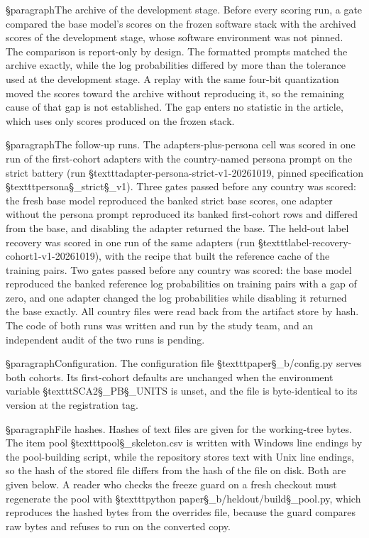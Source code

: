 §paragraph{The archive of the development stage.} Before every scoring run, a gate compared the base model's scores on the frozen software stack with the archived scores of the development stage, whose software environment was not pinned. The comparison is report-only by design. The formatted prompts matched the archive exactly, while the log probabilities differed by more than the tolerance used at the development stage. A replay with the same four-bit quantization moved the scores toward the archive without reproducing it, so the remaining cause of that gap is not established. The gap enters no statistic in the article, which uses only scores produced on the frozen stack.

§paragraph{The follow-up runs.} The adapters-plus-persona cell was scored in one run of the first-cohort adapters with the country-named persona prompt on the strict battery (run §texttt{adapter-persona-strict-v1-20261019}, pinned specification §texttt{persona§_strict§_v1}). Three gates passed before any country was scored: the fresh base model reproduced the banked strict base scores, one adapter without the persona prompt reproduced its banked first-cohort rows and differed from the base, and disabling the adapter returned the base. The held-out label recovery was scored in one run of the same adapters (run §texttt{label-recovery-cohort1-v1-20261019}), with the recipe that built the reference cache of the training pairs. Two gates passed before any country was scored: the base model reproduced the banked reference log probabilities on training pairs with a gap of zero, and one adapter changed the log probabilities while disabling it returned the base exactly. All country files were read back from the artifact store by hash. The code of both runs was written and run by the study team, and an independent audit of the two runs is pending.

§paragraph{Configuration.} The configuration file §texttt{paper§_b/config.py} serves both cohorts. Its first-cohort defaults are unchanged when the environment variable §texttt{SCA2§_PB§_UNITS} is unset, and the file is byte-identical to its version at the registration tag.

§paragraph{File hashes.} Hashes of text files are given for the working-tree bytes. The item pool §texttt{pool§_skeleton.csv} is written with Windows line endings by the pool-building script, while the repository stores text with Unix line endings, so the hash of the stored file differs from the hash of the file on disk. Both are given below. A reader who checks the freeze guard on a fresh checkout must regenerate the pool with §texttt{python paper§_b/heldout/build§_pool.py}, which reproduces the hashed bytes from the overrides file, because the guard compares raw bytes and refuses to run on the converted copy.

